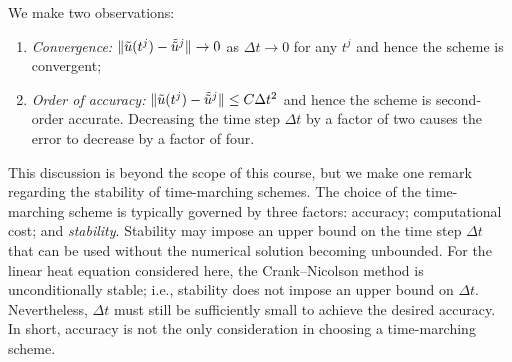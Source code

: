 We make two observations:
\begin{enumerate}
    \item \textit{Convergence:} $\|\tilde{u}(t^j) - \tilde{\tilde{u}}^j\| \to 0$ as $\Delta t \to 0$ for any $t^j$ and hence the scheme is convergent;
    \item \textit{Order of accuracy:} $\|\tilde{u}(t^j) - \tilde{\tilde{u}}^j\| \leq C\Delta t^2$ and hence the scheme is second-order accurate. Decreasing the time step $\Delta t$ by a factor of two causes the error to decrease by a factor of four.
\end{enumerate}

\begin{nremark}[][8.6]
    This discussion is beyond the scope of this course, but we make one remark regarding the stability of time-marching schemes. The choice of the time-marching scheme is typically governed by three factors: accuracy; computational cost; and \textit{stability}. Stability may impose an upper bound on the time step $\Delta t$ that can be used without the numerical solution becoming unbounded. For the linear heat equation considered here, the Crank--Nicolson method is unconditionally stable; i.e., stability does not impose an upper bound on $\Delta t$. Nevertheless, $\Delta t$ must still be sufficiently small to achieve the desired accuracy. In short, accuracy is not the only consideration in choosing a time-marching scheme.
\end{nremark}

